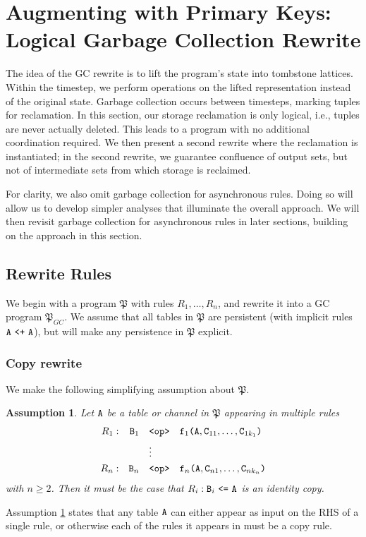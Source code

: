 \documentclass{article}
\numberwithin{equation}{section}
\newtheorem{assumption}[property]{Assumption}
\renewcommand{\tt}[1]{\ifmmode\text{\texttt{#1}}\else\texttt{#1}\fi}
\begin{document}
\section{Augmenting with Primary Keys: Logical Garbage Collection Rewrite}
\label{sec:augment:logical}
The idea of the GC rewrite is to lift the program's state into tombstone lattices.
Within the timestep, we perform operations on the lifted representation instead of the original state.
Garbage collection occurs between timesteps, marking tuples for reclamation.
In this section, our storage reclamation is only logical, i.e., tuples are never actually deleted.
This leads to a program with no additional coordination required.
We then present a second rewrite where the reclamation is instantiated; in the second rewrite, we guarantee confluence of output sets, but not of intermediate sets from which storage is reclaimed.

For clarity, we also omit garbage collection for asynchronous rules.
Doing so will allow us to develop simpler analyses that illuminate the overall approach.
We will then revisit garbage collection for asynchronous rules in later sections, building on the approach in this section.

\subsection{Rewrite Rules}
We begin with a program $\mathfrak{P}$ with rules $R_1, \dots, R_n$, and rewrite it into a GC program $\mathfrak{P}_{GC}$.
We assume that all tables in $\mathfrak{P}$ are persistent (with implicit rules $\tt{A} ~\tt{<+}~ \tt{A}$), but will make any persistence in $\mathfrak{P}$ explicit.

\setcounter{subsubsection}{-1}

\subsubsection{Copy rewrite}
We make the following simplifying assumption about $\mathfrak{P}$.
\begin{assumption}
\label{ass:copy}
Let $\tt{A}$ be a table or channel in $\mathfrak{P}$ appearing in multiple rules
\begin{align*}
R_1: && \tt{B}_1 &\quad\tt{<op>}\quad \tt{f}_1\tt{(}\tt{A},\tt{C}_{11},\dots,\tt{C}_{1k_1}\tt{)}\\
&&&\quad\vdots\\
R_n: && \tt{B}_n &\quad\tt{<op>}\quad \tt{f}_n\tt{(}\tt{A},\tt{C}_{n1},\dots,\tt{C}_{nk_n}\tt{)}
\end{align*}
with $n \geq 2$.
Then it must be the case that $R_i: \tt{B}_i ~\tt{<=}~ \tt{A}$ is an identity copy.
\end{assumption}
Assumption \ref{ass:copy} states that any table $\tt{A}$ can either appear as input on the RHS of a single rule, or otherwise each of the rules it appears in must be a copy rule.
\end{document}
